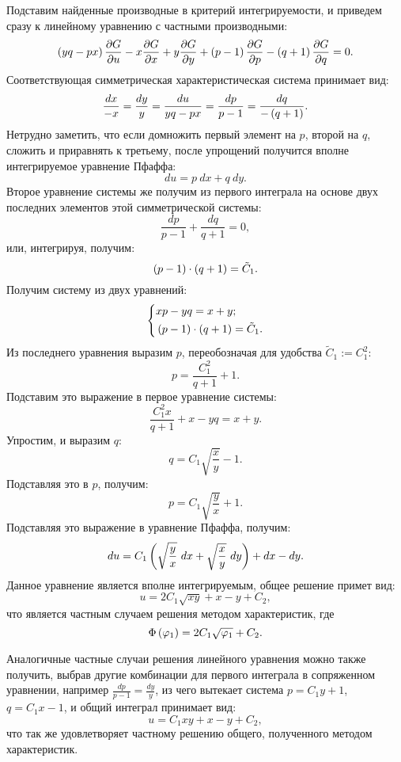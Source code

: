 		Подставим найденные производные в критерий интегрируемости, и приведем сразу к линейному уравнению с частными производными:
		\[ \left( yq - px \right) \dfrac{\partial G}{\partial u} - x \dfrac{\partial G}{\partial x} + y \dfrac{\partial G}{\partial y} + \left( p - 1 \right) \dfrac{\partial G}{\partial p} - \left( q + 1 \right) \dfrac{\partial G}{\partial q} = 0. \] 
		Соответствующая симметрическая характеристическая система принимает вид:
		\[ \frac{dx}{-x} = \frac{dy}{y} = \frac{du}{yq - px} = \frac{dp}{p-1} = \frac{dq}{-\left( q + 1 \right)}. \]
		Нетрудно заметить, что если домножить первый элемент на $p$, второй на $q$, сложить и приравнять к третьему, после упрощений получится вполне интегрируемое уравнение Пфаффа:
		\[ du = p ~ dx + q ~ dy. \]
		Второе уравнение системы же получим из первого интеграла на основе двух последних элементов этой симметрической системы:
		\[ \frac{dp}{p-1} + \frac{dq}{q+1} = 0, \]
		или, интегрируя, получим:
		\[ \left( p-1 \right) \cdot \left( q+1 \right) = \tilde{C}_1. \]
		Получим систему из двух уравнений:
		\[ \left\lbrace \begin{split} 
			&xp - yq = x + y; \\
			&\left( p-1 \right) \cdot \left( q+1 \right) = \tilde{C}_1.
		\end{split} \right. \]
		Из последнего уравнения выразим $p$, переобозначая для удобства $\tilde{C}_1 := C_1^2$:
		\[ p = \frac{C_1^2}{q+1} + 1. \]
		Подставим это выражение в первое уравнение системы:
		\[ \frac{C_1^2 x}{q + 1} + x - yq = x + y. \]
		Упростим, и выразим $q$:
		\[ q = C_1 \sqrt{\frac{x}{y}} - 1. \]
		Подставляя это в $p$, получим:
		\[ p = C_1 \sqrt{\frac{y}{x}} + 1. \]
		Подставляя это выражение в уравнение Пфаффа, получим:
		\[ du = C_1 \left( \sqrt{\frac{y}{x}} ~ dx + \sqrt{\frac{x}{y}} ~ dy  \right) + dx - dy. \]
		Данное уравнение является вполне интегрируемым, общее решение примет вид:
		\[ u = 2C_1 \sqrt{xy} + x - y + C_2, \]
		что является частным случаем решения методом характеристик, где
		\[ \Phi \left( \varphi_1 \right) = 2C_1 \sqrt{\varphi_1} + C_2. \]

		\vspace{10pt}
		
		Аналогичные частные случаи решения линейного уравнения можно также получить, выбрав другие комбинации для первого интеграла в сопряженном уравнении, например $\frac{dp}{p-1} = \frac{dy}{y}$, из чего вытекает система $p = C_1 y + 1$, $q = C_1 x - 1$, и общий интеграл принимает вид:
		\[ u = C_1 xy + x - y + C_2, \]
		что так же удовлетворяет частному решению общего, полученного методом характеристик.

